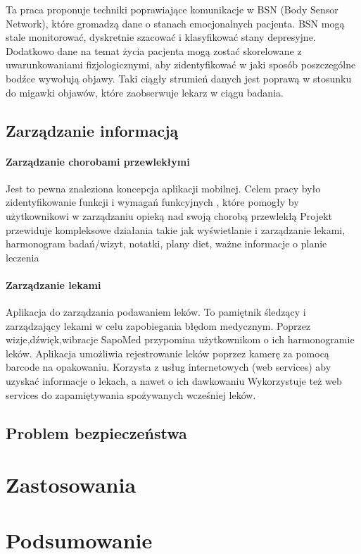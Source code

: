 \documentclass[11pt,twoside,a4paper]
{article}
\begin{document}
Ta praca proponuje techniki poprawiające komunikacje w BSN (Body Sensor Network), które gromadzą dane o stanach emocjonalnych pacjenta. BSN  mogą stale monitorować, dyskretnie szacować i klasyfikować stany depresyjne. Dodatkowo dane na temat życia pacjenta mogą zostać skorelowane z uwarunkowaniami fizjologicznymi, aby zidentyfikować w jaki sposób poszczególne bodźce wywołują objawy. Taki ciągły strumień danych jest poprawą w stosunku do migawki objawów, które zaobserwuje lekarz w ciągu badania. 
 
 
\subsection{Zarządzanie informacją}
\paragraph{Zarządzanie chorobami przewlekłymi\\}
Jest to pewna znaleziona koncepcja aplikacji mobilnej. Celem pracy było zidentyfikowanie funkcji i wymagań funkcyjnych , które pomogły by użytkownikowi w zarządzaniu opieką nad swoją chorobą przewlekłą
 Projekt przewiduje kompleksowe działania takie jak wyświetlanie i zarządzanie lekami, harmonogram badań/wizyt, notatki, plany diet, ważne informacje o planie leczenia

\paragraph{Zarządzanie lekami\\}
 Aplikacja do zarządzania podawaniem leków. To pamiętnik śledzący i zarządzający lekami w celu zapobiegania błędom medycznym. 
 Poprzez wizje,dźwięk,wibracje  SapoMed przypomina użytkownikom o ich harmonogramie leków.
 Aplikacja umożliwia rejestrowanie leków poprzez kamerę za pomocą barcode na opakowaniu. 
 Korzysta z usług internetowych (web services) aby uzyskać informacje o lekach, a nawet o ich dawkowaniu
 Wykorzystuje też web services do zapamiętywania spożywanych wcześniej leków.
\subsection{Problem bezpieczeństwa}

\section{Zastosowania}
\section{Podsumowanie}

\newpage


\end{document}
